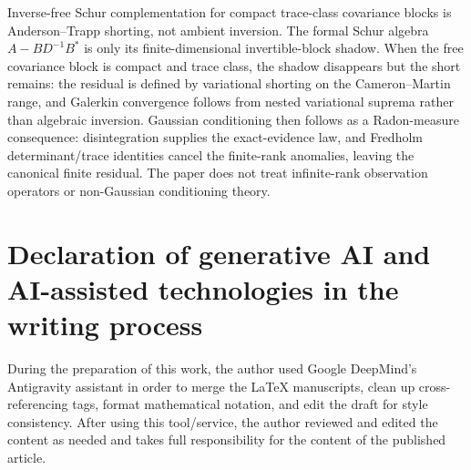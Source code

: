 \documentclass[preprint,12pt]{elsarticle}
\theoremstyle{plain}
\theoremstyle{definition}
\theoremstyle{remark}
\begin{document}
    Inverse-free Schur complementation for compact trace-class covariance blocks
    is Anderson--Trapp shorting, not ambient inversion.  The formal Schur algebra
    $A-BD^{-1}B^*$ is only its finite-dimensional invertible-block shadow.
    When the free covariance block is compact and trace class, the shadow
    disappears but the short remains: the residual is defined by variational
    shorting on the Cameron--Martin range, and Galerkin convergence follows
    from nested variational suprema rather than algebraic inversion.  Gaussian
    conditioning then follows as a Radon-measure consequence:
    disintegration supplies the exact-evidence law, and Fredholm
    determinant/trace identities cancel the finite-rank anomalies, leaving the
    canonical finite residual.  The paper does not treat infinite-rank
    observation operators or non-Gaussian conditioning theory.

    \section*{Declaration of generative AI and AI-assisted technologies in the writing process}

    During the preparation of this work, the author used Google DeepMind's Antigravity assistant in order to merge the LaTeX manuscripts, clean up cross-referencing tags, format mathematical notation, and edit the draft for style consistency. After using this tool/service, the author reviewed and edited the content as needed and takes full responsibility for the content of the published article.

    
    

    \appendix

    
    
\end{document}
